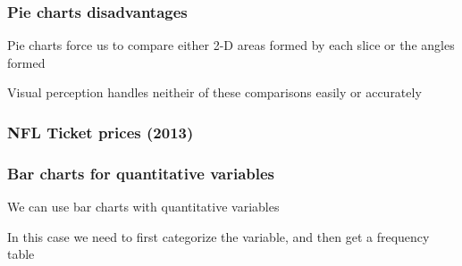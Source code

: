 \documentclass[12pt]{beamer}\usepackage[]{graphicx}\usepackage[]{color}
\makeatletter
\newenvironment{kframe}{%
 \def\at@end@of@kframe{}%
 \ifinner\ifhmode%
  \def\at@end@of@kframe{\end{minipage}}%
  \begin{minipage}{\columnwidth}%
 \fi\fi%
 \def\FrameCommand##1{\hskip\@totalleftmargin \hskip-\fboxsep
 \colorbox{shadecolor}{##1}\hskip-\fboxsep
     \hskip-\linewidth \hskip-\@totalleftmargin \hskip\columnwidth}%
 \MakeFramed {\advance\hsize-\width
   \@totalleftmargin\z@ \linewidth\hsize
   \@setminipage}}%
 {\par\unskip\endMakeFramed%
 \at@end@of@kframe}
\newenvironment{knitrout}{}{} %
\makeatother
\begin{document}

\begin{frame}
\frametitle{Pie charts disadvantages}
\bbi
  \item Pie charts force us to compare either 2-D areas formed by each slice or the angles formed
  \item Visual perception handles neitheir of these comparisons easily or accurately
\ei
\end{frame}


\begin{frame}
\begin{center}
\Huge{}
\end{center}
\end{frame}


\begin{frame}[fragile]
\frametitle{NFL Ticket prices (2013)}
\begin{knitrout}\footnotesize
{}\color{fgcolor}\begin{kframe}


{\ttfamily\noindent{}}

{\ttfamily\noindent\bfseries{}}

{\ttfamily\noindent\bfseries\color{errorcolor}{\#\# Error in cbind(ticks[1:16, ], ticks[17:32, ]): object 'ticks' not found}}

{\ttfamily\noindent\bfseries\color{errorcolor}{\#\# Error in eval(expr, envir, enclos): object 'ticks' not found}}\end{kframe}
\end{knitrout}
\end{frame}


\begin{frame}
\frametitle{Bar charts for quantitative variables}
\bbi
  \item We can use bar charts with quantitative variables
  \item In this case we need to first categorize the variable, and then get a frequency table
\ei
\end{frame}
\end{document}
